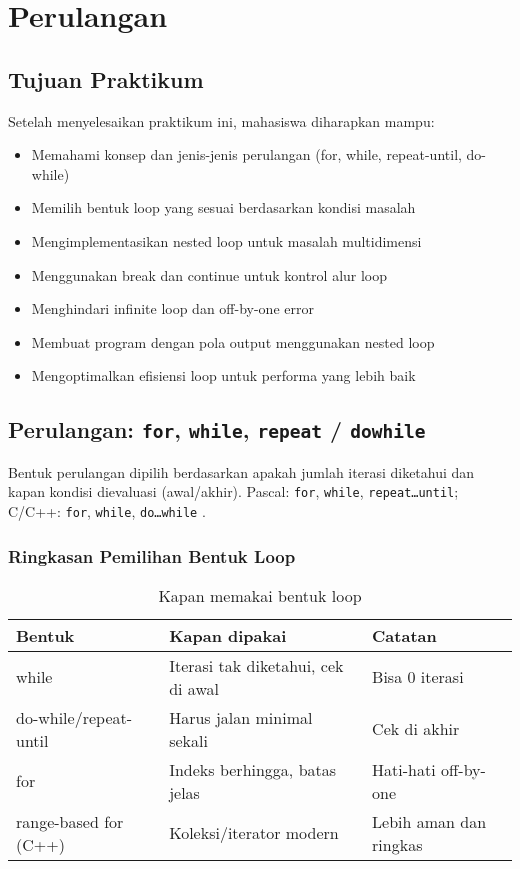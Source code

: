 \documentclass[../main.tex]{subfiles}
\begin{document}
\chapter{Perulangan}

\section*{Tujuan Praktikum}
Setelah menyelesaikan praktikum ini, mahasiswa diharapkan mampu:
\begin{itemize}
  \item Memahami konsep dan jenis-jenis perulangan (for, while, repeat-until, do-while)
  \item Memilih bentuk loop yang sesuai berdasarkan kondisi masalah
  \item Mengimplementasikan nested loop untuk masalah multidimensi
  \item Menggunakan break dan continue untuk kontrol alur loop
  \item Menghindari infinite loop dan off-by-one error
  \item Membuat program dengan pola output menggunakan nested loop
  \item Mengoptimalkan efisiensi loop untuk performa yang lebih baik
\end{itemize}

\section{Perulangan: \texttt{for}, \texttt{while}, \texttt{repeat} / \texttt{do\textendash while}}
Bentuk perulangan dipilih berdasarkan apakah jumlah iterasi diketahui dan kapan kondisi dievaluasi (awal/akhir). Pascal: \texttt{for}, \texttt{while}, \texttt{repeat\ldots until}; C/C++: \texttt{for}, \texttt{while}, \texttt{do\ldots while} \parencite{free-pascal-docs,gnu-c-manual,cpp-reference}.

\subsection{Ringkasan Pemilihan Bentuk Loop}
\begin{table}[H]
  \centering
  \caption{Kapan memakai bentuk loop}
  \begin{tabular}{@{}lll@{}}
    \toprule
    Bentuk & Kapan dipakai & Catatan \\
    \midrule
    while & Iterasi tak diketahui, cek di awal & Bisa 0 iterasi \\
    do-while/repeat-until & Harus jalan minimal sekali & Cek di akhir \\
    for & Indeks berhingga, batas jelas & Hati-hati off-by-one \\
    range-based for (C++) & Koleksi/iterator modern & Lebih aman dan ringkas \\
    \bottomrule
  \end{tabular}
\end{table}
\end{document}
